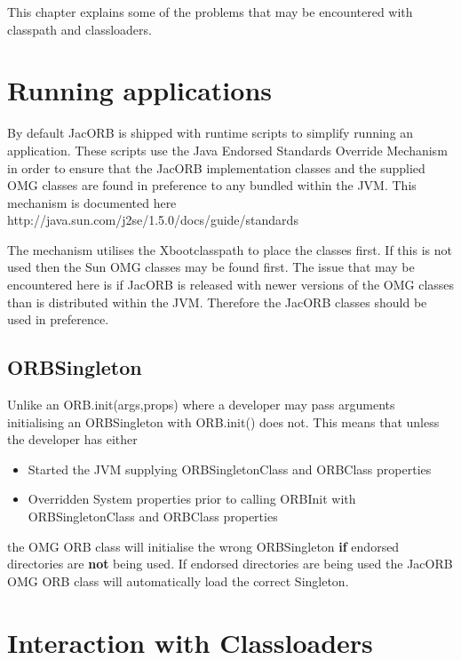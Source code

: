 %
%

This chapter explains some of the problems that may be encountered with classpath and classloaders.

\section{Running applications}
\label{appRunningEndorsed}

By default JacORB is shipped with runtime scripts to simplify running
an application.  These scripts use the Java Endorsed Standards
Override Mechanism in order to ensure that the JacORB implementation
classes and the supplied OMG classes are found in preference to any
bundled within the JVM. This mechanism is documented here
http://java.sun.com/j2se/1.5.0/docs/guide/standards


The mechanism utilises the Xbootclasspath to place the classes first. If
this is not used then the Sun OMG classes may be found first. The issue
that may be encountered here is if JacORB is released with newer versions
of the OMG classes than is distributed within the JVM. Therefore the JacORB
classes should be used in preference.


\subsection{ORBSingleton}
Unlike an ORB.init(args,props) where a developer may pass arguments initialising
an ORBSingleton with ORB.init() does not. This means that unless the developer has
either

\begin{itemize}
\item Started the JVM supplying ORBSingletonClass and ORBClass properties
\item Overridden System properties prior to calling ORBInit with ORBSingletonClass and ORBClass properties
\end{itemize}

 the OMG ORB class will initialise the wrong ORBSingleton \textbf{if} endorsed
directories are \textbf{not} being used. If endorsed directories are being used
the JacORB OMG ORB class will automatically load the correct Singleton.


\section{Interaction with Classloaders}

